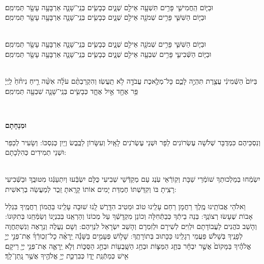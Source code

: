 \documentclass[twoside, openany, parskip=half, 11pt]{book}
\begin{document}
 \\
וּבַיּ֧וֹם הַֽחֲמִישִׁ֛י פָּרִ֥ים תִּשְׁעָ֖ה אֵילִ֣ם שְׁנָ֑יִם כְּבָשִׂ֧ים בְּנֵֽי־שָׁנָ֛ה אַרְבָּעָ֥ה עָשָׂ֖ר תְּמִימִֽם׃ 
\\
 וּבַיּ֧וֹם הַשִּׁשִּׁ֛י פָּרִ֥ים שְׁמֹנָ֖ה אֵילִ֣ם שְׁנָ֑יִם כְּבָשִׂ֧ים בְּנֵֽי־שָׁנָ֛ה אַרְבָּעָ֥ה עָשָׂ֖ר תְּמִימִֽם׃ 



 \\
וּבַיּ֧וֹם הַשִּׁשִּׁ֛י פָּרִ֥ים שְׁמֹנָ֖ה אֵילִ֣ם שְׁנָ֑יִם כְּבָשִׂ֧ים בְּנֵֽי־שָׁנָ֛ה אַרְבָּעָ֥ה עָשָׂ֖ר תְּמִימִֽם׃ 
\\
 וּבַיּ֧וֹם הַשְּֿׁבִיעִ֛י פָּרִ֥ים שִׁבְעָ֖ה אֵילִ֣ם שְׁנָ֑יִם כְּבָשִׂ֧ים בְּנֵֽי־שָׁנָ֛ה אַרְבָּעָ֥ה עָשָׂ֖ר תְּמִימִֽם׃ 



\\
בַּיּוֹם֙ הַשְּֿׁמִינִ֔י עֲצֶ֖רֶת תִּהְיֶ֣ה לָכֶ֑ם כָּל־מְלֶ֥אכֶת עֲבֹדָ֖ה לֹ֥א תַֽעֲשֽׂוּ׃ וְהִקְרַבְתֶּ֨ם עֹלָ֜ה אִשֵּׁ֨ה רֵ֤יחַ נִיחֹ֨חַ֙ לַֽיְיָ֔ פַּ֥ר אֶחָ֖ד אַ֣יִל אֶחָ֑ד כְּבָשִׂ֧ים בְּנֵֽי־שָׁנָ֛ה שִׁבְעָ֖ה תְּמִימִֽם׃

\\ \label{uminchasam}
\begin{Large}\textbf{וּמִנְחָתָם}\end{Large}
 וְנִסְכֵּיהֶם כִּמְדֻבָּר שְׁלֹשָׁה עֶשְׂרוֹנִים לַפָּר וּשְׁנֵי עֶשְׂרֹנִים לָאָֽיִל וְעִשָּׂרוֹן לַכֶּֽבֶשׂ וְיַֽיִן כְּנִסְכּוֹ: וְשָׂעִיר לְכַפֵּר וּשְׁנֵי תְמִידִים כְּהִלְכָתָם:

\begin{sometimes}

\shabbos\\
יִשְׂמְֿחוּ בְמַלְכוּתְךָ שׁוֹמְֿרֵי שַׁבָּת וְקֽוֹרְֿאֵי עֹֽנֶג עַם מְקַדְּֿשֵׁי שְׁבִיעִי כֻּלָּם יִשְׂבְּֿעוּ וְיִתְעַנְּֿגוּ מִטּוּבֶֽךָ וּבַשְּֿׁבִיעִי רָצִֽיתָ בּוֹ וְקִדַּשְׁתּוֹ חֶמְדַּת יָמִים אוֹתוֹ קָרָֽאתָ זֵֽכֶר לְמַעֲשֵׂה בְרֵאשִׁית:

\end{sometimes}

\enlargethispage{\baselineskip}
וֵאלֹהֵי אֲבוֹתֵֽינוּ מֶֽלֶךְ רַחֲמָן רַחֵם עָלֵֽינוּ טוֹב וּמֵטִיב הִדָּֽרֶשׁ לָֽנוּ שׁוּבָה עָלֵֽינוּ בַּהֲמוֹן רַחֲמֶֽיךָ בִּגְלַל אָבוֹת שֶׁעָשׂוּ רְצוֹנֶֽךָ: בְּנֵה בֵיתְֿךָ כְּבַתְּֿחִלָּה וְכוֹנֵן מִקְדָשְֿׁךָ עַל מְכוֹנוֹ וְהַרְאֵֽנוּ בְּבִנְיָנוֹ וְשַׂמְּֿחֵֽנוּ בְּתִקּוּנוֹ: וְהָשֵׁב כֹּהֲנִים לַעֲבוֹדָתָם וּלְוִיִּם לְשִׁירָם וּלְזִמְרָם וְהָשֵׁב יִשְׂרָאֵל לִנְוֵיהֶם: וְשָׁם נַעֲלֶה וְנֵרָאֶה וְנִשְׁתַּחֲוֶה לְפָנֶֽיךָ בְּשָׁלֹֹשׁ פַּעֲמֵי רְגָלֵֽינוּ כַּכָּתוּב בְּתוֹרָתֶֽךָ: שָׁל֣וֹשׁ פְּעָמִ֣ים בַּשָּׁנָ֡ה יֵֽרָאֶ֨ה כָל־זְכֽוּרְֿךָ֜ אֶת־פְּנֵ֣י יְיָ֣ אֱלֹהֶ֗יךָ בַּמָּקוֹם֙ אֲשֶׁ֣ר יִבְחָ֔ר בְּחַ֧ג הַמַּצּ֛וֹת וּבְחַ֥ג הַשָּֽׁבֻע֖וֹת וּבְחַ֣ג הַסֻּכּ֑וֹת וְלֹ֧א יֵֽרָאֶ֛ה אֶת־פְּנֵ֥י יְיָ֖ רֵיקָֽם׃ אִ֖ישׁ כְּמַתְּֿנַֽת יָד֑וֹ כְּבִרְכַּ֛ת יְיָ֥ אֱלֹהֶ֖יךָ אֲשֶׁ֥ר נָֽתַן־לָֽךְ׃
\end{document}
